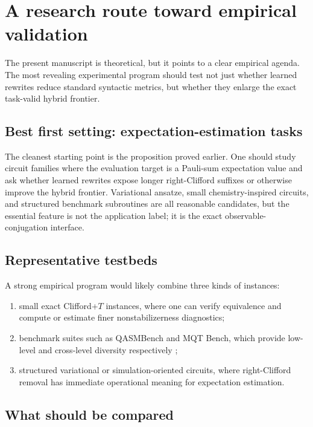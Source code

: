 \documentclass[11pt]{article}
\theoremstyle{remark}
\begin{document}
\section{A research route toward empirical validation}

The present manuscript is theoretical, but it points to a clear empirical agenda. The most revealing experimental program should test not just whether learned rewrites reduce standard syntactic metrics, but whether they enlarge the exact task-valid hybrid frontier.

\subsection{Best first setting: expectation-estimation tasks}

The cleanest starting point is the proposition proved earlier. One should study circuit families where the evaluation target is a Pauli-sum expectation value and ask whether learned rewrites expose longer right-Clifford suffixes or otherwise improve the hybrid frontier. Variational ansatze, small chemistry-inspired circuits, and structured benchmark subroutines are all reasonable candidates, but the essential feature is not the application label; it is the exact observable-conjugation interface.

\subsection{Representative testbeds}

A strong empirical program would likely combine three kinds of instances:
\begin{enumerate}[label=(\alph*), leftmargin=1.5em]
    \item small exact Clifford+$T$ instances, where one can verify equivalence and compute or estimate finer nonstabilizerness diagnostics;
    \item benchmark suites such as QASMBench and MQT Bench, which provide low-level and cross-level diversity respectively \cite{qasmbench_2020, mqtbench_2023};
    \item structured variational or simulation-oriented circuits, where right-Clifford removal has immediate operational meaning for expectation estimation.
\end{enumerate}

\subsection{What should be compared}
\end{document}
